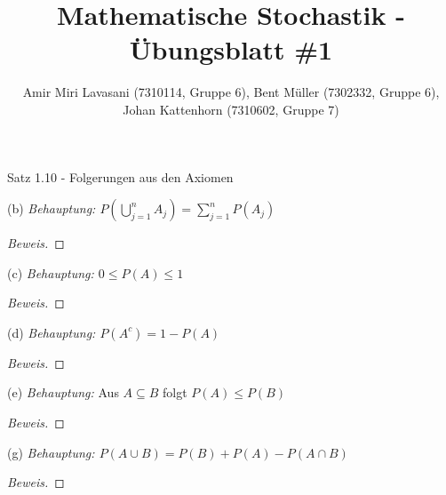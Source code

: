 \documentclass[10pt]{article}
\newenvironment{Aufgabe}[2][Aufgabe]{\begin{trivlist}
\item[\hskip \labelsep {\bfseries #1}\hskip \labelsep {\bfseries #2.}]}{\end{trivlist}}
\begin{document}
 
\title{ \textbf{Mathematische Stochastik - Übungsblatt \#1} }

\author{Amir Miri Lavasani (7310114, Gruppe 6), Bent Müller (7302332, Gruppe 6), \\ 
Johan Kattenhorn (7310602, Gruppe 7)} \maketitle

 
\begin{Aufgabe}{1}
    Satz 1.10 - Folgerungen aus den Axiomen
\end{Aufgabe}

(b) \textit{ Behauptung: $ P\left( \bigcup\limits_{j=1}^{n} A_j \right) = \sum\limits_{j=1}^{n} P(A_j) $ }
\begin{proof}[Beweis]
\end{proof}

(c) \textit{Behauptung: $0 \leq P(A) \leq 1$}
\begin{proof}[Beweis]
\end{proof}

(d) \textit{Behauptung: $P(A^c) = 1 - P(A)$}
\begin{proof}[Beweis]
\end{proof}

(e) \textit{Behauptung: } Aus $A \subseteq B$ folgt $P(A) \leq P(B)$
\begin{proof}[Beweis]
\end{proof}

(g) \textit{Behauptung: $P(A \cup B) = P(B) + P(A) - P(A \cap B)$}
\begin{proof}[Beweis]
\end{proof}
\end{document}
